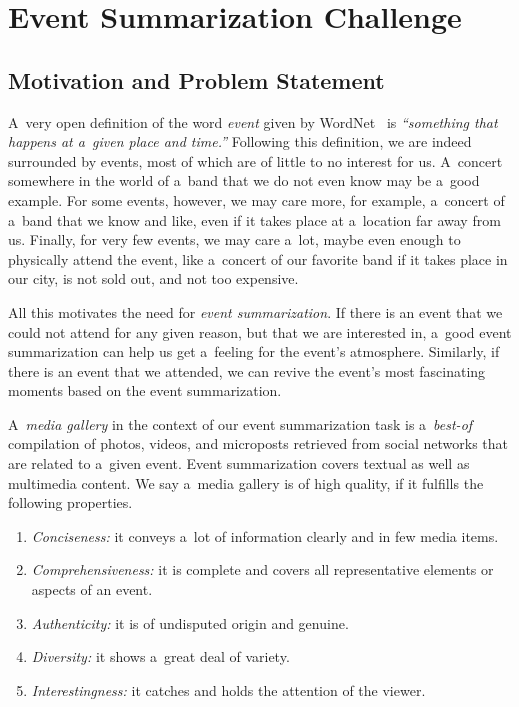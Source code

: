 \chapter{Event Summarization Challenge}
\label{cha:introduction}

\ifpdf
    \graphicspath{{1_introduction/figures/PNG/}{1_introduction/figures/PDF/}{1_introduction/figures/}}
\else
    \graphicspath{{1_introduction/figures/EPS/}{1_introduction/figures/}}
\fi

\section{Motivation and Problem Statement}

A~very open definition of the word \emph{event}
given by WordNet~\cite{fellbaum1998wordnet,miller1995wordnet} is
\emph{``something that happens at a~given place and time.''}
Following this definition,
we are indeed surrounded by events,
most of which are of little to no interest for us.
A~concert somewhere in the world of a~band
that we do not even know may be a~good example.
For some events, however, we may care more, for example,
a~concert of a~band that we know and like,
even if it takes place at a~location far away from us.
Finally, for very few events, we may care a~lot,
maybe even enough to physically attend the event,
like a~concert of our favorite band
if it takes place in our city, is not sold out,
and not too expensive.

All this motivates the need for \emph{event summarization}.
If there is an event that we could not attend
for any given reason,
but that we are interested in,
a~good event summarization can help us get a~feeling
for the event's atmosphere.
Similarly, if there is an event that we attended,
we can revive the event's most fascinating moments
based on the event summarization.

A~\emph{media gallery} in the context of
our event summarization task is
a~\emph{best-of} compilation of photos, videos,
and microposts retrieved from social networks
that are related to a~given event.
Event summarization covers textual
as well as multimedia content.
We say a~media gallery is of high quality,
if it fulfills the following properties.

\begin{enumerate}
  \item \textit{Conciseness:}
        it conveys a~lot of information clearly
        and in few media items.
  \item \textit{Comprehensiveness:}
        it is complete and covers all representative
        elements or aspects of an event.
  \item \textit{Authenticity:}
        it is of undisputed origin and genuine.
  \item \textit{Diversity:}
        it shows a~great deal of variety.
  \item \textit{Interestingness:}
        it catches and holds the attention of the viewer.
\end{enumerate}


